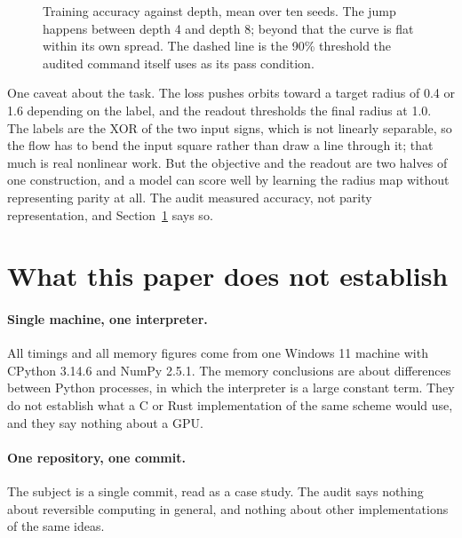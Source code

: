 \documentclass[11pt,a4paper]{article}
\begin{document}
\begin{figure}[t]
\centering
{}
\caption{Training accuracy against depth, mean over ten seeds. The jump happens between depth 4
and depth 8; beyond that the curve is flat within its own spread. The dashed line is the 90\%
threshold the audited command itself uses as its pass condition.}
\label{fig:depth}
\end{figure}

One caveat about the task. The loss pushes orbits toward a target radius of 0.4 or 1.6 depending
on the label, and the readout thresholds the final radius at 1.0. The labels are the XOR of the
two input signs, which is not linearly separable, so the flow has to bend the input square rather
than draw a line through it; that much is real nonlinear work. But the objective and the readout
are two halves of one construction, and a model can score well by learning the radius map without
representing parity at all. The audit measured accuracy, not parity representation, and
Section~\ref{sec:not-confirmed} says so.

\section{What this paper does not establish}
\label{sec:not-confirmed}

\paragraph{Single machine, one interpreter.} All timings and all memory figures come from one
Windows 11 machine with CPython 3.14.6 and NumPy 2.5.1. The memory conclusions are about
differences between Python processes, in which the interpreter is a large constant term. They do
not establish what a C or Rust implementation of the same scheme would use, and they say nothing
about a GPU.

\paragraph{One repository, one commit.} The subject is a single commit, read as a case study. The
audit says nothing about reversible computing in general, and nothing about other implementations
of the same ideas.
\end{document}
